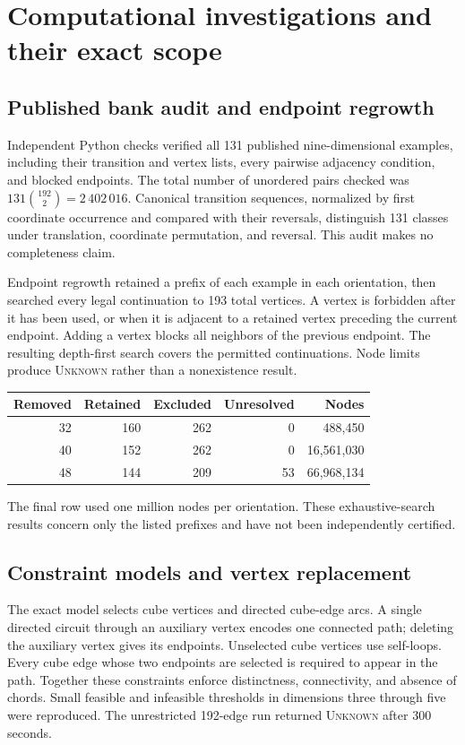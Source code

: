 \documentclass[11pt,a4paper]{article}
\theoremstyle{definition}
\theoremstyle{remark}
\begin{document}
\section{Computational investigations and their exact scope}
\subsection{Published bank audit and endpoint regrowth}
Independent Python checks verified all 131 published nine-dimensional examples, including their transition and vertex lists, every pairwise adjacency condition, and blocked endpoints. The total number of unordered pairs checked was $131\binom{192}{2}=2\,402\,016$. Canonical transition sequences, normalized by first coordinate occurrence and compared with their reversals, distinguish 131 classes under translation, coordinate permutation, and reversal. This audit makes no completeness claim.

Endpoint regrowth retained a prefix of each example in each orientation, then searched every legal continuation to 193 total vertices. A vertex is forbidden after it has been used, or when it is adjacent to a retained vertex preceding the current endpoint. Adding a vertex blocks all neighbors of the previous endpoint. The resulting depth-first search covers the permitted continuations. Node limits produce \textsc{Unknown} rather than a nonexistence result.
\begin{center}\begin{tabular}{rrrrr}
\toprule
Removed & Retained & Excluded & Unresolved & Nodes\\\midrule
32&160&262&0&488,450\\
40&152&262&0&16,561,030\\
48&144&209&53&66,968,134\\\bottomrule
\end{tabular}\end{center}
The final row used one million nodes per orientation. These exhaustive-search results concern only the listed prefixes and have not been independently certified.

\subsection{Constraint models and vertex replacement}
The exact model selects cube vertices and directed cube-edge arcs. A single directed circuit through an auxiliary vertex encodes one connected path; deleting the auxiliary vertex gives its endpoints. Unselected cube vertices use self-loops. Every cube edge whose two endpoints are selected is required to appear in the path. Together these constraints enforce distinctness, connectivity, and absence of chords. Small feasible and infeasible thresholds in dimensions three through five were reproduced. The unrestricted 192-edge run returned \textsc{Unknown} after 300 seconds.
\end{document}
